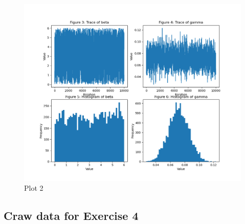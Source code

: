 \documentclass[a4paper]{article}
\begin{document}
    \begin{figure}[!ht]
        \includegraphics[width=\linewidth, inner]{Images/ex3plot2.png}
        \caption{Plot 2}
        \label{fig:ex3-3}
    \end{figure}

    \subsection{Craw data for Exercise 4}
\end{document}
